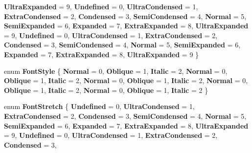 \begin{DoxyCompactItemize}
{\bfseries Ultra\+Expanded} = 9, 
{\bfseries Undefined} = 0, 
{\bfseries Ultra\+Condensed} = 1, 
\newline
{\bfseries Extra\+Condensed} = 2, 
{\bfseries Condensed} = 3, 
{\bfseries Semi\+Condensed} = 4, 
{\bfseries Normal} = 5, 
\newline
{\bfseries Semi\+Expanded} = 6, 
{\bfseries Expanded} = 7, 
{\bfseries Extra\+Expanded} = 8, 
{\bfseries Ultra\+Expanded} = 9, 
\newline
{\bfseries Undefined} = 0, 
{\bfseries Ultra\+Condensed} = 1, 
{\bfseries Extra\+Condensed} = 2, 
{\bfseries Condensed} = 3, 
\newline
{\bfseries Semi\+Condensed} = 4, 
{\bfseries Normal} = 5, 
{\bfseries Semi\+Expanded} = 6, 
{\bfseries Expanded} = 7, 
\newline
{\bfseries Extra\+Expanded} = 8, 
{\bfseries Ultra\+Expanded} = 9
 \}
\item 
\mbox{\label{namespace_windows_1_1_u_i_1_1_text_a60a89aee1a9831c91a4aabca7103b5e8}} 
enum {\bfseries Font\+Style} \{ \newline
{\bfseries Normal} = 0, 
{\bfseries Oblique} = 1, 
{\bfseries Italic} = 2, 
{\bfseries Normal} = 0, 
\newline
{\bfseries Oblique} = 1, 
{\bfseries Italic} = 2, 
{\bfseries Normal} = 0, 
{\bfseries Oblique} = 1, 
\newline
{\bfseries Italic} = 2, 
{\bfseries Normal} = 0, 
{\bfseries Oblique} = 1, 
{\bfseries Italic} = 2, 
\newline
{\bfseries Normal} = 0, 
{\bfseries Oblique} = 1, 
{\bfseries Italic} = 2
 \}
\item 
\mbox{\label{namespace_windows_1_1_u_i_1_1_text_a5d8427c75e3dbef5872b8609b90b88e2}} 
enum {\bfseries Font\+Stretch} \{ \newline
{\bfseries Undefined} = 0, 
{\bfseries Ultra\+Condensed} = 1, 
{\bfseries Extra\+Condensed} = 2, 
{\bfseries Condensed} = 3, 
\newline
{\bfseries Semi\+Condensed} = 4, 
{\bfseries Normal} = 5, 
{\bfseries Semi\+Expanded} = 6, 
{\bfseries Expanded} = 7, 
\newline
{\bfseries Extra\+Expanded} = 8, 
{\bfseries Ultra\+Expanded} = 9, 
{\bfseries Undefined} = 0, 
{\bfseries Ultra\+Condensed} = 1, 
\newline
{\bfseries Extra\+Condensed} = 2, 
{\bfseries Condensed} = 3, 

\end{DoxyCompactItemize}

